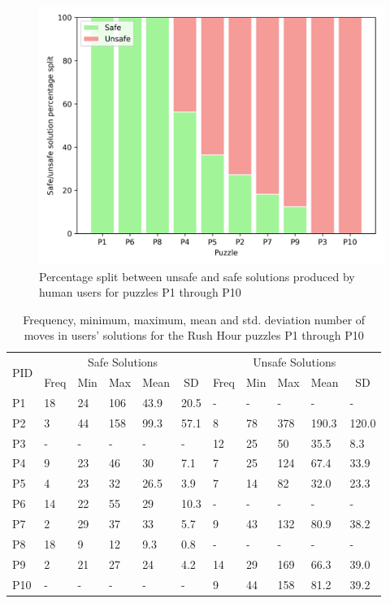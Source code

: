 \begin{figure}[htb]
  \centering
\includegraphics[width=0.5\columnwidth]{img/p2.png}
  \caption{Percentage split between unsafe and safe solutions produced by human users for puzzles P1 through P10}
  \label{fig:split}
\end{figure}
\begin{table}[htb]
\begin{tabular}{|l|l|l|l|l|l|l|l|l|l|l|}
\hline
\multicolumn{1}{|c|}{\multirow{2}{*}{PID}} &
  \multicolumn{5}{c|}{Safe Solutions} &
  \multicolumn{5}{c|}{Unsafe Solutions} \\ \cline{2-11} 
\multicolumn{1}{|c|}{} &
  \multicolumn{1}{c|}{Freq} &
  \multicolumn{1}{c|}{Min} &
  \multicolumn{1}{c|}{Max} &
  \multicolumn{1}{c|}{Mean} &
  \multicolumn{1}{c|}{SD} &
  \multicolumn{1}{c|}{Freq} &
  \multicolumn{1}{c|}{Min} &
  \multicolumn{1}{c|}{Max} &
  \multicolumn{1}{c|}{Mean} &
  \multicolumn{1}{c|}{SD} \\ \hline
P1  & 18 & 24 & 106 & 43.9  & 20.5  & -  & -  & -   & -    & -    \\ 
P2  &  3  & 44 & 158 & 99.3 & 57.1 & 8  & 78 & 378 & 190.3 & 120.0\\ 
P3  & -  & -  & -   & -     & -     & 12 & 25 & 50  & 35.5 & 8.3  \\ 
P4  & 9  & 23 & 46  & 30    & 7.1   & 7  & 25 & 124 & 67.4 & 33.9 \\ 
P5  & 4  & 23 & 32  & 26.5  & 3.9   & 7  & 14 & 82  & 32.0 & 23.3 \\
P6  & 14 & 22 & 55  & 29    & 10.3  & -  & -  & -   & -    & -    \\
P7  & 2  & 29 & 37  & 33    & 5.7   & 9  & 43 & 132 & 80.9 & 38.2 \\ 
P8  & 18 & 9  & 12  & 9.3   & 0.8   & -  & -  & -   & -    & -    \\
P9  & 2  & 21 & 27  & 24    & 4.2   & 14 & 29 & 169 & 66.3 & 39.0 \\
P10 & -  & -  & -   & -     & -     & 9  & 44 & 158 & 81.2 & 39.2 \\ \hline
\end{tabular}
\caption{Frequency, minimum, maximum, mean and std. deviation number of moves in users' solutions for the Rush Hour puzzles P1 through P10}
\label{tab:usersolutions}
\end{table}

